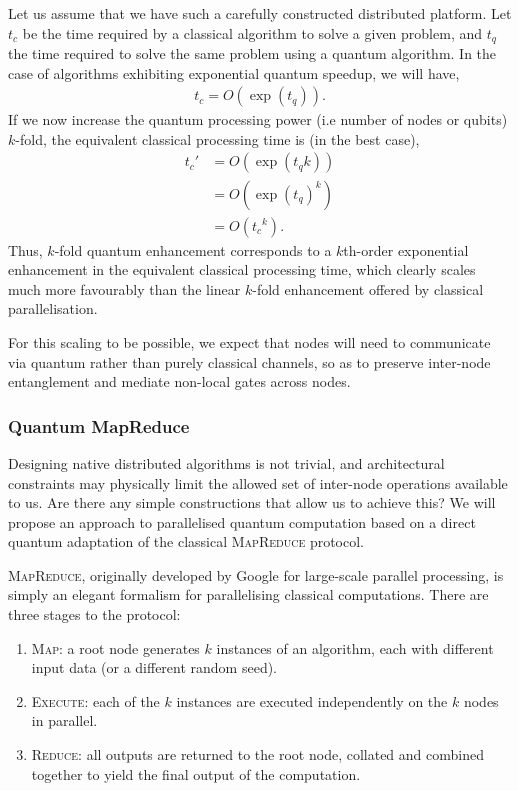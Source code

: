 Let us assume that we have such a carefully constructed distributed platform. Let $t_c$ be the time required by a classical algorithm to solve a given problem, and $t_q$ the time required to solve the same problem using a quantum algorithm. In the case of algorithms exhibiting exponential quantum speedup, we will have,
\begin{align}
t_c = O(\exp (t_q)).
\end{align}
If we now increase the quantum processing power (i.e number of nodes or qubits) $k$-fold, the equivalent classical processing time is (in the best case),
\begin{align}
t_c' &= O(\exp (t_q k)) \nonumber \\
&= O(\exp (t_q)^{k}) \nonumber \\
&= O({t_c}^{k}).
\end{align}
Thus, $k$-fold quantum enhancement corresponds to a $k$th-order exponential enhancement in the equivalent classical processing time, which clearly scales much more favourably than the linear $k$-fold enhancement offered by classical parallelisation.

For this scaling to be possible, we expect that nodes will need to communicate via quantum rather than purely classical channels, so as to preserve inter-node entanglement and mediate non-local gates across nodes.

\subsubsection{Quantum MapReduce}


Designing native distributed algorithms is not trivial, and architectural constraints may physically limit the allowed set of inter-node operations available to us. Are there any simple constructions that allow us to achieve this? We will propose an approach to parallelised quantum computation based on a direct quantum adaptation of the classical \textsc{MapReduce} protocol.

\textsc{MapReduce}, originally developed by Google for large-scale parallel processing, is simply an elegant formalism for parallelising classical computations. There are three stages to the protocol:
\begin{enumerate}
	\item \textsc{Map}: a root node generates $k$ instances of an algorithm, each with different input data (or a different random seed).
	\item \textsc{Execute}: each of the $k$ instances are executed independently on the $k$ nodes in parallel.
	\item \textsc{Reduce}: all outputs are returned to the root node, collated and combined together to yield the final output of the computation.
\end{enumerate}

